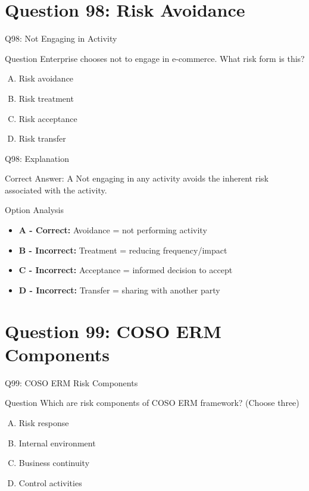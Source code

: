 \documentclass{beamer}
\begin{document}
	\section{Question 98: Risk Avoidance}
	
	\begin{frame}{Q98: Not Engaging in Activity}
		\begin{block}{Question}
			Enterprise chooses not to engage in e-commerce. What risk form is this?
		\end{block}
		\begin{enumerate}[(A)]
			\item Risk avoidance
			\item Risk treatment
			\item Risk acceptance
			\item Risk transfer
		\end{enumerate}
	\end{frame}
	
	\begin{frame}{Q98: Explanation}
		\begin{block}{Correct Answer: A}
			Not engaging in any activity avoids the inherent risk associated with the activity.
		\end{block}
		\begin{block}{Option Analysis}
			\begin{itemize}
				\item \textbf{A - Correct:} Avoidance = not performing activity
				\item \textbf{B - Incorrect:} Treatment = reducing frequency/impact
				\item \textbf{C - Incorrect:} Acceptance = informed decision to accept
				\item \textbf{D - Incorrect:} Transfer = sharing with another party
			\end{itemize}
		\end{block}
	\end{frame}
	
	\section{Question 99: COSO ERM Components}
	
	\begin{frame}{Q99: COSO ERM Risk Components}
		\begin{block}{Question}
			Which are risk components of COSO ERM framework? (Choose three)
		\end{block}
		\begin{enumerate}[(A)]
			\item Risk response
			\item Internal environment
			\item Business continuity
			\item Control activities
		\end{enumerate}
	\end{frame}
	
\end{document}
